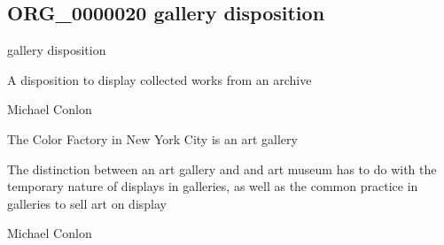 \documentclass[letterpaper,10pt,english]{sphinxmanual}
\begin{document}
\subsection{ORG\_0000020 \sphinxhyphen{} gallery disposition}
\label{\detokenize{doc-ORG_0000020:org-0000020-gallery-disposition}}\label{\detokenize{doc-ORG_0000020:index-0}}\label{\detokenize{doc-ORG_0000020::doc}}
\begin{sphinxShadowBox}

\sphinxAtStartPar
gallery disposition
\end{sphinxShadowBox}

\begin{sphinxShadowBox}

\sphinxAtStartPar
{\hyperref[\detokenize{doc-BFO_0000016::doc}]{}}
\end{sphinxShadowBox}

\begin{sphinxShadowBox}

\sphinxAtStartPar
A disposition to display collected works from an archive
\end{sphinxShadowBox}

\begin{sphinxShadowBox}

\sphinxAtStartPar
Michael Conlon 
\end{sphinxShadowBox}

\begin{sphinxShadowBox}

\sphinxAtStartPar
The Color Factory in New York City is an art gallery
\end{sphinxShadowBox}

\begin{sphinxShadowBox}

\sphinxAtStartPar
The distinction between an art gallery and and art museum has to do with the temporary nature of displays in galleries, as well as the common practice in galleries to sell art on display
\end{sphinxShadowBox}

\begin{sphinxShadowBox}

\sphinxAtStartPar
Michael Conlon 
\end{sphinxShadowBox}
\begin{quote}

\ignorespaces \end{quote}
\end{document}
